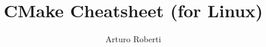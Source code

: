\documentclass[a4paper]{article}
\title{CMake Cheatsheet (for Linux)}
\author{Arturo Roberti}
\begin{document}
\begin{multicols*}{2}\footnotesize
    \maketitle

    
    
    
    
    
    
    
    
    
\end{multicols*}

\end{document}
